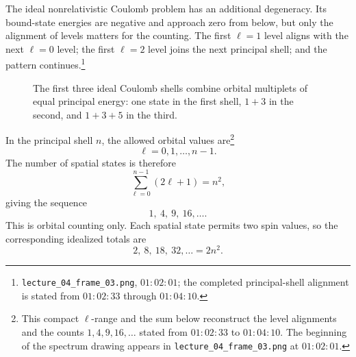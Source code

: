 The ideal nonrelativistic Coulomb problem has an additional degeneracy. Its bound-state energies are negative and approach zero from below, but only the alignment of levels matters for the counting. The first \(\ell=1\) level aligns with the next \(\ell=0\) level; the first \(\ell=2\) level joins the next principal shell; and the pattern continues.\footnote{\texttt{lecture\_04\_frame\_03.png}, \(01{:}02{:}01\); the completed principal-shell alignment is stated from \(01{:}02{:}33\) through \(01{:}04{:}10\).}

\begin{figure}[htbp]
\centering
{}
\caption{The first three ideal Coulomb shells combine orbital multiplets of equal principal energy: one state in the first shell, \(1+3\) in the second, and \(1+3+5\) in the third.}
\end{figure}

In the principal shell \(n\), the allowed orbital values are\footnote{This compact \(\ell\)-range and the sum below reconstruct the level alignments and the counts \(1,4,9,16,\ldots\) stated from \(01{:}02{:}33\) to \(01{:}04{:}10\). The beginning of the spectrum drawing appears in \texttt{lecture\_04\_frame\_03.png} at \(01{:}02{:}01\).}
\[
\ell=0,1,\ldots,n-1.
\]
The number of spatial states is therefore
\begin{equation}
\sum_{\ell=0}^{n-1}(2\ell+1)=n^{2},
\end{equation}
giving the sequence
\begin{equation}
1,\ 4,\ 9,\ 16,\ldots .
\end{equation}
This is orbital counting only. Each spatial state permits two spin values, so the corresponding idealized totals are
\begin{equation}
2,\ 8,\ 18,\ 32,\ldots=2n^{2}.
\end{equation}

